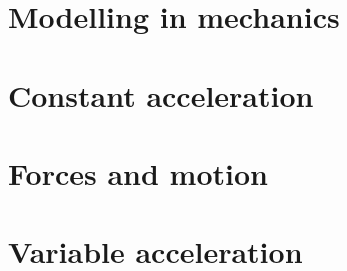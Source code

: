 \chapter{Modelling in mechanics}


\chapter{Constant acceleration}


\chapter{Forces and motion}


\chapter{Variable acceleration}

